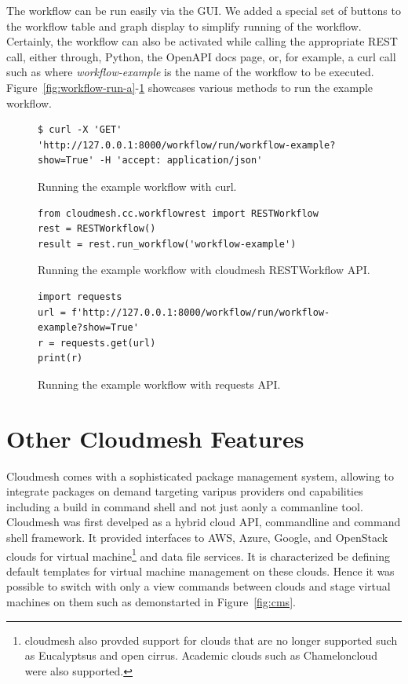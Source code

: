 The workflow can be run easily via the GUI. We added a special set of
buttons to the workflow table and graph display to simplify running of
the workflow. 
Certainly, the workflow can also be activated while
calling the appropriate REST call, either through, Python, the OpenAPI
docs page, or, for example, a curl call such as
where {\em workflow-example} is the name of the workflow to be
executed. Figure~\ref{fig:workflow-run-a}-\ref{fig:workflow-run-c} showcases various methods to
run the example workflow.


\begin{figure}[htb]

\begin{verbatim}
$ curl -X 'GET' 'http://127.0.0.1:8000/workflow/run/workflow-example?show=True' -H 'accept: application/json'
\end{verbatim}
\flushleft
\caption{\parindent0pt Running the example workflow with curl.}
\label{fig:workflow-run-a}
\bigskip

\begin{verbatim} 
from cloudmesh.cc.workflowrest import RESTWorkflow
rest = RESTWorkflow()
result = rest.run_workflow('workflow-example')
\end{verbatim}
\caption{Running the example workflow with cloudmesh RESTWorkflow API.}
\label{fig:workflow-run-b}
\bigskip

\begin{verbatim}
import requests
url = f'http://127.0.0.1:8000/workflow/run/workflow-example?show=True'
r = requests.get(url)
print(r)
\end{verbatim}

\caption{Running the example workflow with requests API.}
\label{fig:workflow-run-c}

\end{figure}









% 


\section{Other Cloudmesh Features}

Cloudmesh comes with a sophisticated package management system, allowing to integrate packages on demand targeting varipus providers ond capabilities including a build in command shell and not just aonly a commanline tool.  Cloudmesh was first develped as a hybrid cloud API, commandline and command shell framework. It provided interfaces to AWS, Azure, Google, and OpenStack clouds for virtual machine\footnote{cloudmesh also provded support for clouds that are no longer supported such as Eucalyptsus and open cirrus. Academic clouds such as Chameloncloud were also supported.} and data file services. It is characterized be defining default templates for virtual machine management on these clouds. Hence it was possible to switch with only a view commands between clouds and stage virtual machines on them such as demonstarted in Figure~\ref{fig:cms}.

